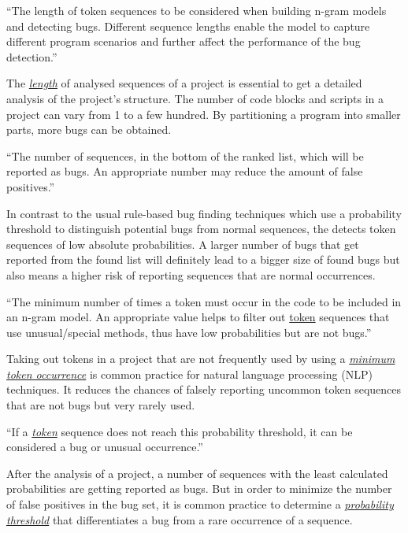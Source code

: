 \begin{definition}\label{def:sequence_length}
    ``The length of token sequences to be considered when building n-gram models and detecting bugs. Different sequence lengths enable the model to capture different program scenarios and further affect the performance of the bug detection.''~\cite{bugram}
\end{definition}

The \hyperref[def:sequence_length]{\textit{length}} of analysed sequences of a project is essential to get a detailed analysis of the project's structure. The number of code blocks and scripts in a \scratch{} project can vary from 1 to a few hundred. By partitioning a program into smaller parts, more bugs can be obtained.

\begin{definition}\label{def:reporting_size}
    ``The number of sequences, in the bottom of the ranked list, which will be reported as bugs. An appropriate number may reduce the amount of false positives.''~\cite{bugram}
\end{definition}

In contrast to the usual rule-based bug finding techniques which use a probability threshold to distinguish potential bugs from normal sequences, the \ngram{} detects token sequences of low absolute probabilities. A larger number of bugs that get reported from the found list will definitely lead to a bigger size of found bugs but also means a higher risk of reporting sequences that are normal occurrences.

\begin{definition}\label{def:minimum_token_occurrence}
    ``The minimum number of times a token must occur in the code to be included in an n-gram model. An appropriate value helps to filter out \hyperref[def:token]{token} sequences that use unusual/special methods, thus have low probabilities but are not bugs.''~\cite{bugram}
\end{definition}

Taking out tokens in a project that are not frequently used by using a \hyperref[def:minimum_token_occurrence]{\textit{minimum token occurrence}} is common practice for natural language processing (NLP) techniques. It reduces the chances of falsely reporting uncommon token sequences that are not bugs but very rarely used. 

\begin{definition}\label{def:probability_threshold}
    ``If a \hyperref[def:token]{\textit{token}} sequence does not reach this probability threshold, it can be considered a bug or unusual occurrence.''
\end{definition}

After the analysis of a project, a number of sequences with the least calculated probabilities are getting reported as bugs. But in order to minimize the number of false positives in the bug set, it is common practice to determine a \hyperref[def:probability_threshold]{\textit{probability threshold}} that differentiates a bug from a rare occurrence of a sequence. 